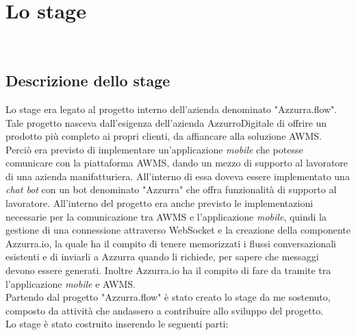 
\chapter{Lo stage}
\label{cap:descrizione-stage}

\\

\section{Descrizione dello stage}
Lo stage era legato al progetto interno dell'azienda denominato "Azzurra.flow". Tale progetto nasceva dall'esigenza dell'azienda AzzurroDigitale di offrire un prodotto più completo ai propri clienti, da affiancare alla soluzione \gls{AWMS}. Perciò era previsto di implementare un’applicazione \emph{mobile} che potesse comunicare con la piattaforma \gls{AWMS}, dando un mezzo di supporto al lavoratore di una azienda manifatturiera. All'interno di essa doveva essere implementato una \emph{chat bot} con un \gls{bot}\ap{[g]} denominato "Azzurra" che offra funzionalità di supporto al lavoratore. All'interno del progetto era anche previsto le implementazioni necessarie per la comunicazione tra \gls{AWMS} e l'applicazione \emph{mobile}, quindi la gestione di una connessione attraverso \gls{WebSocket}\ap{[g]} e la creazione della componente Azzurra.io, la quale ha il compito di tenere memorizzati i flussi conversazionali esistenti e di inviarli a Azzurra quando li richiede, per sapere che messaggi devono essere generati. Inoltre Azzurra.io ha il compito di fare da tramite tra l'applicazione \emph{mobile} e \gls{AWMS}.\\
Partendo dal progetto "Azzurra.flow" è stato creato lo stage da me sostenuto, composto da attività che andassero a contribuire allo sviluppo del progetto. \\
Lo stage è stato costruito inserendo le seguenti parti:

